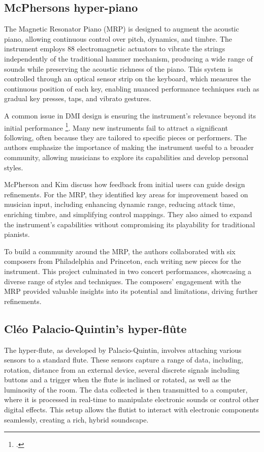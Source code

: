 \documentclass[12pt,twoside,maitrise]{dms_ks}
\theoremstyle{definition}
\begin{document}
\subsection{McPhersons hyper-piano}

The Magnetic Resonator Piano (MRP) is designed to augment the acoustic piano, allowing continuous control over pitch, dynamics, and timbre. 
The instrument employs 88 electromagnetic actuators to vibrate the strings independently of the traditional hammer mechanism, producing a wide range of sounds while preserving the acoustic richness of the piano. 
This system is controlled through an optical sensor strip on the keyboard, which measures the continuous position of each key, enabling nuanced performance techniques such as gradual key presses, taps, and vibrato gestures.

A common issue in DMI design is ensuring the instrument's relevance beyond its initial performance \footcite{mcpherson_problem_2012}. 
Many new instruments fail to attract a significant following, often because they are tailored to specific pieces or performers. 
The authors emphasize the importance of making the instrument useful to a broader community, allowing musicians to explore its capabilities and develop personal styles.

McPherson and Kim discuss how feedback from initial users can guide design refinements. 
For the MRP, they identified key areas for improvement based on musician input, including enhancing dynamic range, reducing attack time, enriching timbre, and simplifying control mappings. 
They also aimed to expand the instrument's capabilities without compromising its playability for traditional pianists.

To build a community around the MRP, the authors collaborated with six composers from Philadelphia and Princeton, each writing new pieces for the instrument. 
This project culminated in two concert performances, showcasing a diverse range of styles and techniques. 
The composers' engagement with the MRP provided valuable insights into its potential and limitations, driving further refinements.

\subsection{Cléo Palacio-Quintin's hyper-flûte}

The hyper-flute, as developed by Palacio-Quintin, involves attaching various sensors to a standard flute. 
These sensors capture a range of data, including, rotation, distance from an external device, several discrete signals including buttons and a trigger when the flute is inclined or rotated, as well as the luminosity of the room. 
The data collected is then transmitted to a computer, where it is processed in real-time to manipulate electronic sounds or control other digital effects. 
This setup allows the flutist to interact with electronic components seamlessly, creating a rich, hybrid soundscape.
\end{document}
